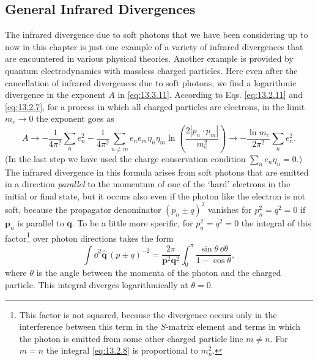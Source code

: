 
\subsection{General Infrared Divergences}

The infrared divergence due to soft photons that we have been considering up
to now in this chapter is just one example of a variety of infrared divergences
that are encountered in various physical theories. Another example is
provided by quantum electrodynamics with massless charged particles. Here even
after the cancellation of infrared divergences due to soft photons, we find a
logarithmic divergence in the exponent $A$ in \eqref{eq:13.3.11}.
According to Eqs. \eqref{eq:13.2.11} and
\eqref{eq:13.2.7}, for a process in which all charged particles are
electrons, in the limit $m_e\to0$ the exponent goes as
\[
A\to-\frac{1}{4\pi^2}\sum_n e_n^2
-\frac{1}{4\pi^2}\sum_{n\ne m}e_ne_m\eta_n\eta_m
\ln\left(\frac{2|p_n\cdot p_m|}{m_e^2}\right)
\to-\frac{\ln m_e}{2\pi^2}\sum_n e_n^2.
\]
(In the last step we have used the charge conservation condition
$\sum_ne_n\eta_n=0$.) The infrared divergence in this formula arises from
soft photons that are emitted in a direction \emph{parallel} to the momentum
of one of the `hard' electrons in the initial or final state, but it occurs
also even if the photon like the electron is not soft, because the propagator
denominator $(p_n\pm q)^2$ vanishes for $p_n^2=q^2=0$ if $\mathbf p_n$ is
parallel to $\mathbf q$. To be a little more specific, for $p_n^2=q^2=0$ the
integral of this factor\footnote{This factor is not squared, because the
divergence occurs only in the interference between this term in the $S$-matrix
element and terms in which the photon is emitted from some other charged
particle line $m\ne n$. For $m=n$ the integral \eqref{eq:13.2.8} is
proportional to $m_n^2$.} over photon directions takes the form
\[
\int \dd^2\hat{\mathbf q}\,(p\pm q)^{-2}
=\frac{2\pi}{\mathbf p^2\mathbf q^2}\int_0^\pi
\frac{\sin\theta\,\dd\theta}{1-\cos\theta},
\]
where $\theta$ is the angle between the momenta of the photon and the charged
particle. This integral diverges logarithmically at $\theta=0$.

